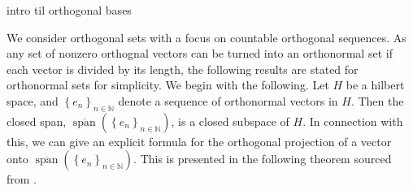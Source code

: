 \documentclass[../thesis.tex]{subfiles}
\begin{document}
intro til orthogonal bases 

We consider orthogonal sets with a focus on countable orthogonal sequences. As any set of nonzero orthognal vectors can be turned into an orthonormal set if each vector is divided by its length, the following results are stated for orthonormal sets for simplicity. 
We begin with the following. Let $H$ be a hilbert space, and $\left\{ e_{n} \right\}_{n\in \mathbb{N}}$ denote a sequence of orthonormal vectors in $H$. Then the closed span, $\overline{\operatorname{span}}\left( \left\{ e_{n} \right\}_{n\in \mathbb{N}} \right)$, is a closed subspace of $H$. In connection with this, we can give an explicit formula for the orthogonal projection of a vector onto $\overline{\operatorname{span}}\left( \left\{ e_{n} \right\}_{n\in \mathbb{N}} \right)$. This is presented in the following theorem sourced from \cite{heilMetricsNormsInner2018}.
\end{document}
